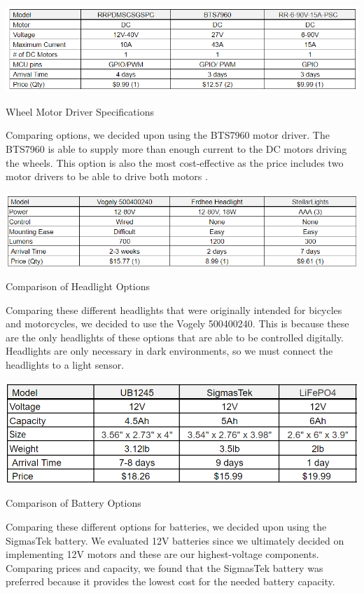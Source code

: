 \begin{table}[H]
	\centering
	\includegraphics[width=1\textwidth]{./Images/wheel_driver_table.png}
	\caption{\label{fig:wheel_driver}Wheel Motor Driver Specifications}
\end{table}

\noindent Comparing options, we decided upon using the BTS7960 motor driver. The BTS7960 is able to supply more than enough current to the DC motors driving the wheels. This option is also the most cost-effective as the price includes two motor drivers to be able to drive both motors \cite{RioRand} \cite{Gikfun} \cite{Hobbywing}.\\

\begin{table}[H]
	\centering
	\includegraphics[width=1\textwidth]{./Images/headlight_table.png}
	\caption{\label{fig:headlights}Comparison of Headlight Options}
\end{table}

\noindent Comparing these different headlights that were originally intended for bicycles and motorcycles, we decided to use the Vogely ‎500400240. This is because these are the only headlights of these options that are able to be controlled digitally. Headlights are only necessary in dark environments, so we must connect the headlights to a light sensor. \cite{vogely2024} \cite{frdhee2024} \cite{stellarlights2024}\\

\begin{table}[H]
	\centering
	\includegraphics[width=1\textwidth]{./Images/battery_table.png}
	\caption{\label{fig:batteries}Comparison of Battery Options}
\end{table}

\noindent Comparing these different options for batteries, we decided upon using the SigmasTek battery. We evaluated 12V batteries since we ultimately decided on implementing 12V motors and these are our highest-voltage components. Comparing prices and capacity, we found that the SigmasTek battery was preferred because it provides the lowest cost for the needed battery capacity. \cite{liftmaster2024} \cite{lifepo42024} \cite{ub12452024}\\